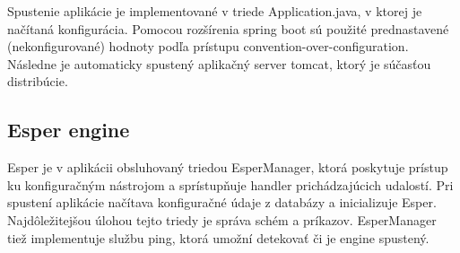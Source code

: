 		Spustenie aplikácie je implementované v triede Application.java, v ktorej je načítaná konfigurácia. Pomocou rozšírenia spring boot sú použité prednastavené (nekonfigurované) hodnoty podľa prístupu convention-over-configuration. Následne je automaticky spustený aplikačný server tomcat, ktorý je súčasťou distribúcie.

	\subsection{Esper engine}
		Esper je v aplikácii obsluhovaný triedou EsperManager, ktorá poskytuje prístup ku konfiguračným nástrojom a sprístupňuje handler prichádzajúcich udalostí. Pri spustení aplikácie načítava konfiguračné údaje z databázy a inicializuje Esper. Najdôležitejšou úlohou tejto triedy je správa schém a príkazov. EsperManager tiež implementuje službu ping, ktorá umožní detekovať či je engine spustený.
		
